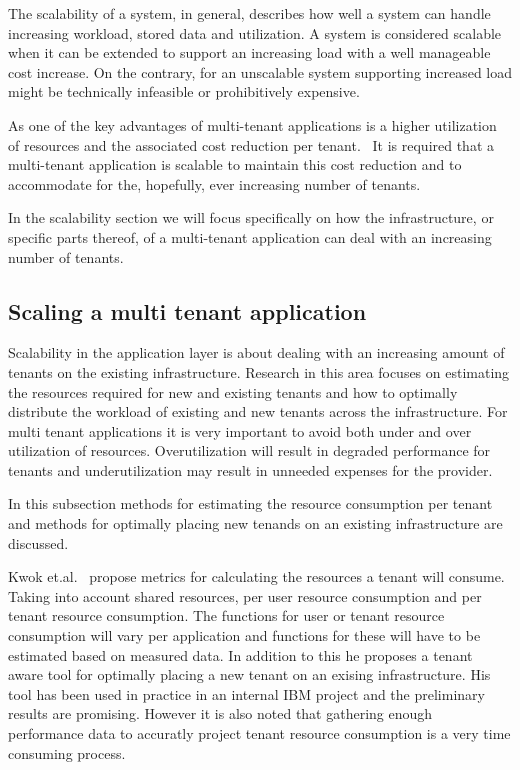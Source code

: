 The scalability of a system, in general, describes how well a system can handle increasing workload, stored data and utilization.
A system is considered scalable when it can be extended to support an increasing load with a well manageable cost increase.
On the contrary, for an unscalable system supporting increased load might be technically infeasible or prohibitively expensive.~\cite{bondi2000scalability}

As one of the key advantages of multi-tenant applications is a higher utilization of resources and the associated cost reduction per tenant.~\cite{bezemer2010multi} 
It is required that a multi-tenant application is scalable to maintain this cost reduction and to accommodate for the, hopefully, ever increasing number of tenants.

In the scalability section we will focus specifically on how the infrastructure, or specific parts thereof, of a multi-tenant application can deal with an increasing number of tenants.

\subsection{Scaling a multi tenant application}
Scalability in the application layer is about dealing with an increasing amount of tenants on the existing infrastructure.
Research in this area focuses on estimating the resources required for new and existing tenants and how to optimally distribute the workload of existing and new tenants across the infrastructure. 
For multi tenant applications it is very important to avoid both under and over utilization of resources.
Overutilization will result in degraded performance for tenants and underutilization may result in unneeded expenses for the provider.

In this subsection methods for estimating the resource consumption per tenant and methods for optimally placing new tenands on an existing infrastructure are discussed.

Kwok et.al.~\cite{kwok2008resource} propose metrics for calculating the resources a tenant will consume.
Taking into account shared resources, per user resource consumption and per tenant resource consumption.
The functions for user or tenant resource consumption will vary per application and functions for these will have to be estimated based on measured data.
In addition to this he proposes a tenant aware tool for optimally placing a new tenant on an exising infrastructure.
His tool has been used in practice in an internal IBM project and the preliminary results are promising. 
However it is also noted that gathering enough performance data to accuratly project tenant resource consumption is a very time consuming process.

